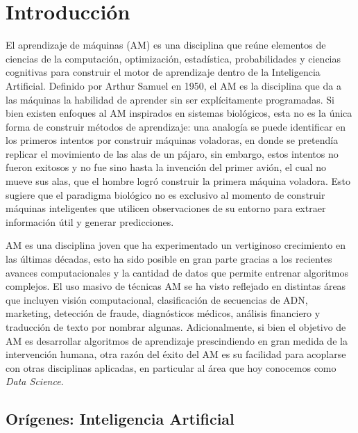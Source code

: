 

\section{Introducción}


El aprendizaje de máquinas (AM) es una disciplina que reúne elementos de ciencias de la computación, optimización, estadística, probabilidades y ciencias cognitivas para construir el motor de aprendizaje dentro de la Inteligencia Artificial. Definido por Arthur Samuel en 1950, el AM es la disciplina que da a las máquinas la habilidad de aprender sin ser explícitamente programadas. Si bien existen enfoques al AM inspirados en sistemas biológicos, esta no es la única forma de construir métodos de aprendizaje: una analogía se puede identificar en los primeros intentos por construir máquinas voladoras, en donde se pretendía replicar el movimiento de las alas de un pájaro, sin embargo, estos intentos no fueron exitosos y no fue sino hasta la invención del primer avión, el cual no mueve sus alas, que el hombre logró construir la primera máquina voladora. Esto sugiere que el paradigma biológico no es exclusivo al momento de construir máquinas inteligentes que utilicen observaciones de su entorno para extraer información útil y generar predicciones. 


AM es una disciplina joven que ha experimentado un vertiginoso crecimiento en las últimas décadas, esto ha sido posible en gran parte gracias a los recientes avances computacionales y la cantidad de datos que permite entrenar algoritmos complejos. El uso masivo de técnicas AM se ha visto reflejado en distintas áreas que incluyen visión computacional, clasificación de secuencias de ADN, marketing, detección de fraude, diagnósticos médicos, análisis financiero y traducción de texto por nombrar algunas. Adicionalmente, si bien el objetivo de AM es desarrollar algoritmos de aprendizaje prescindiendo en gran medida de la intervención humana,  otra razón del éxito del AM es su facilidad para acoplarse con otras disciplinas aplicadas, en particular al área que hoy conocemos como \textit{Data Science}. 

\subsection{Orígenes: Inteligencia Artificial}

